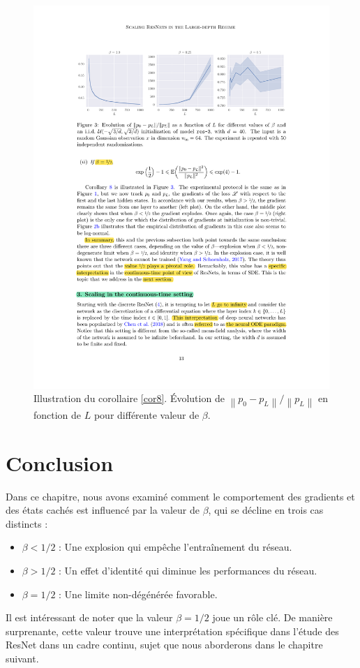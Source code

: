 \begin{figure}[H]
    \centering
    \includegraphics[width=.95\textwidth]{figs/figure_cor8.pdf}
    \caption{Illustration du corollaire \ref{cor8}. Évolution de $ \left\| p_0 - p_L \right\| / \left\| p_L \right\| $ en fonction de $ L $ pour différente valeur de $ \beta  $.}
    \label{fig:cor8}
\end{figure}

\section{Conclusion}\label{ccl_chap2}
Dans ce chapitre, nous avons examiné comment le comportement des gradients et des états cachés est influencé par la valeur de $\beta$, qui se décline en trois cas distincts :
\begin{itemize}
    \item $\beta < 1/2$ : Une explosion qui empêche l'entraînement du réseau.
    \item $\beta > 1/2$ : Un effet d'identité qui diminue les performances du réseau.
    \item $\beta = 1/2$ : Une limite non-dégénérée favorable.
\end{itemize}
Il est intéressant de noter que la valeur $\beta = 1/2$ joue un rôle clé. De manière surprenante, cette valeur trouve une interprétation spécifique dans l'étude des ResNet dans un cadre continu, sujet que nous aborderons dans le chapitre suivant.
